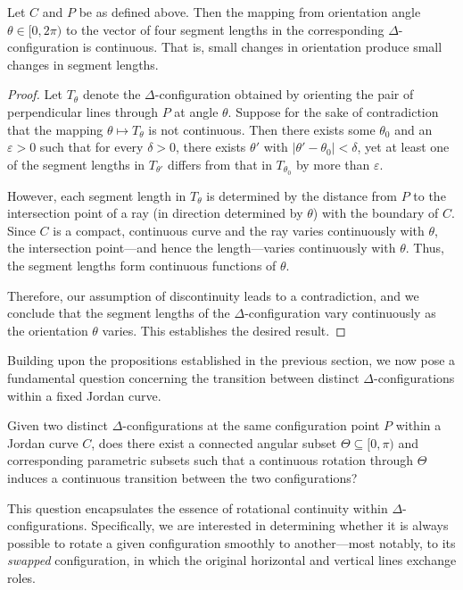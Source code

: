 \begin{proposition}
Let $C$ and $P$ be as defined above. Then the mapping from orientation angle $\theta \in [0, 2\pi)$ to the vector of four segment lengths in the corresponding $\Delta$-configuration is continuous. That is, small changes in orientation produce small changes in segment lengths.
\end{proposition}

\begin{proof}
Let $T_\theta$ denote the $\Delta$-configuration obtained by orienting the pair of perpendicular lines through $P$ at angle $\theta$. Suppose for the sake of contradiction that the mapping $\theta \mapsto T_\theta$ is not continuous. Then there exists some $\theta_0$ and an $\varepsilon > 0$ such that for every $\delta > 0$, there exists $\theta'$ with $|\theta' - \theta_0| < \delta$, yet at least one of the segment lengths in $T_{\theta'}$ differs from that in $T_{\theta_0}$ by more than $\varepsilon$.

However, each segment length in $T_\theta$ is determined by the distance from $P$ to the intersection point of a ray (in direction determined by $\theta$) with the boundary of $C$. Since $C$ is a compact, continuous curve and the ray varies continuously with $\theta$, the intersection point—and hence the length—varies continuously with $\theta$. Thus, the segment lengths form continuous functions of $\theta$.

Therefore, our assumption of discontinuity leads to a contradiction, and we conclude that the segment lengths of the $\Delta$-configuration vary continuously as the orientation $\theta$ varies. This establishes the desired result.
\end{proof}

Building upon the propositions established in the previous section, we now pose a fundamental question concerning the transition between distinct $\Delta$-configurations within a fixed Jordan curve.

\begin{question}
Given two distinct $\Delta$-configurations at the same configuration point $P$ within a Jordan curve $C$, does there exist a connected angular subset $\Theta \subseteq [0, \pi)$ and corresponding parametric subsets such that a continuous rotation through $\Theta$ induces a continuous transition between the two configurations?
\end{question}

This question encapsulates the essence of rotational continuity within $\Delta$-configurations. Specifically, we are interested in determining whether it is always possible to rotate a given configuration smoothly to another—most notably, to its \emph{swapped} configuration, in which the original horizontal and vertical lines exchange roles.

